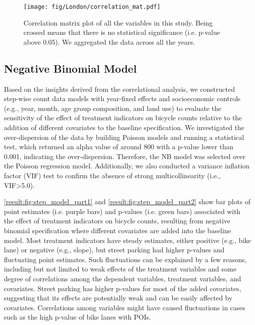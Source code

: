 \documentclass[preprint,12pt, authoryear]{elsarticle}
\begin{document}
\begin{figure}
    \centering
    \texttt{[image: fig/London/correlation\_mat.pdf]}
    \caption{Correlation matrix plot of all the variables in this study. Being crossed means that there is no statistical significance (i.e. p-value above 0.05). We aggregated the data across all the years.}
    \label{result:fig:corr_mat}
\end{figure}

\subsection{Negative Binomial Model}
Based on the insights derived from the correlational analysis, we constructed step-wise count data models with year-fixed effects and socioeconomic controls (e.g., year, month, age group composition, and land use) to evaluate the sensitivity of the effect of treatment indicators on bicycle counts relative to the addition of different covariates to the baseline specification.
We investigated the over-dispersion of the data by building Poisson models and running a statistical test, which returned an alpha value of around 800 with a p-value lower than 0.001, indicating the over-dispersion. 
Therefore, the NB model was selected over the Poisson regression model. 
Additionally, we also conducted a variance inflation factor (VIF) test to confirm the absence of strong multicollinearity (i.e., VIF>5.0).

\autoref{result:fig:step_model_part1} and \autoref{result:fig:step_model_part2} show bar plots of point estimates (i.e. purple bars) and p-values (i.e. green bars) associated with the effect of treatment indicators on bicycle counts, resulting from negative binomial specification where different covariates are added into the baseline model. 
Most treatment indicators have steady estimates, either positive (e.g., bike lane) or negative (e.g., slope), but street parking had higher p-values and fluctuating point estimates. 
Such fluctuations can be explained by a few reasons, including but not limited to weak effects of the treatment variables and some degree of correlations among the dependent variables, treatment variables, and covariates. 
Street parking has higher p-values for most of the added covariates, suggesting that its effects are potentially weak and can be easily affected by covariates.
Correlations among variables might have caused fluctuations in cases such as the high p-value of bike lanes with POIs.
\end{document}
